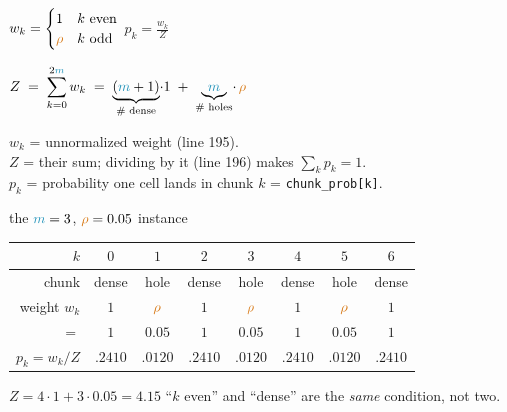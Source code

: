 \documentclass[11pt]{article}
\newcommand{\mm}{{\color{cy}m}}
\newcommand{\rr}{{\color{og}\rho}}
\newcommand{\gloss}[1]{{\sffamily\scriptsize\color{lab}#1}}
\begin{document}
\vspace{1mm}
\begin{minipage}[t]{0.38\textwidth}
\vspace{0pt}
$\displaystyle w_k = \begin{cases} 1 & k \text{ even} \\ \rr & k \text{ odd}\end{cases}$
\qquad
$\displaystyle p_k = \frac{w_k}{Z}$

\vspace{2mm}
$\displaystyle Z \;=\; \sum_{k=0}^{2\mm} w_k
  \;=\; \underbrace{(\mm+1)}_{\text{\# dense}}\!\cdot 1
  \;+\; \underbrace{\mm}_{\text{\# holes}}\!\cdot\,\rr$

\vspace{2mm}
\gloss{$w_k$ = unnormalized weight (line 195).\\
$Z$ = their sum; dividing by it (line 196) makes $\textstyle\sum_k p_k = 1$.\\
$p_k$ = probability one cell lands in chunk $k$ = \texttt{chunk\_prob[k]}.}
\end{minipage}
\hfill
\begin{minipage}[t]{0.58\textwidth}
\vspace{0pt}
\centering
{\sffamily\small the $\mm=3$, $\rr=0.05$ instance}\\[1.5mm]
\renewcommand{\arraystretch}{1.25}
\setlength{\tabcolsep}{4pt}
\begin{tabular}{r|ccccccc}
\sffamily\footnotesize\color{lab} $k$ & $0$ & $1$ & $2$ & $3$ & $4$ & $5$ & $6$ \\
\hline
\sffamily\footnotesize\color{lab} chunk
 & \cellcolor{dens}dense & \cellcolor{holec}hole & \cellcolor{dens}dense & \cellcolor{holec}hole
 & \cellcolor{dens}dense & \cellcolor{holec}hole & \cellcolor{dens}dense \\
\sffamily\footnotesize\color{lab} weight $w_k$
 & $1$ & $\rr$ & $1$ & $\rr$ & $1$ & $\rr$ & $1$ \\
\sffamily\footnotesize\color{lab} $\;\;\;\;\;= $
 & $1$ & $0.05$ & $1$ & $0.05$ & $1$ & $0.05$ & $1$ \\
\hline
\sffamily\footnotesize\color{lab} $p_k = w_k/Z$
 & $.2410$ & $.0120$ & $.2410$ & $.0120$ & $.2410$ & $.0120$ & $.2410$ \\
\end{tabular}

\vspace{1.5mm}
{\small $Z = 4\cdot 1 + 3\cdot 0.05 = 4.15$ \qquad
 ``$k$ even'' and ``dense'' are the \emph{same} condition, not two.}
\end{minipage}
\end{document}
